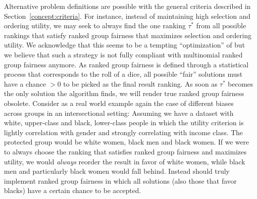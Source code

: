 \label{concept:related-problems}
%
Alternative problem definitions are possible with the general criteria described in Section~\ref{concept:criteria}.
%
For instance, instead of maintaining high selection and ordering utility, we may seek to always find the one ranking $\tau^*$ from all possible rankings that satisfy ranked group fairness that maximizes selection and ordering utility. 
%
We acknowledge that this seems to be a tempting ``optimization'' of \algoFAIR but we believe that such a strategy is not fully compliant with multinomial ranked group fairness anymore. 
%
As ranked group fairness is defined through a statistical process that corresponds to the roll of a dice, all possible ``fair'' solutions must have a chance $>0$ to be picked as the final result ranking.
%
As soon as $\tau^*$ becomes the only solution the algorithm finds, we will render true ranked group fairness obsolete. 
%
Consider as a real world example again the case of different biases across groups in an intersectional setting:
%
Assuming we have a dataset with white, upper-class and black, lower-class people in which the utility criterion is lightly correlation with gender and strongly correlating with income class.
%
The protected group would be white women, black men and black women.
%
If we were to always choose the ranking that satisfies ranked group fairness and maximizes utility, we would \emph{always} reorder the result in favor of white women, while black men and particularly black women would fall behind.
%
Instead \algoFAIR should truly implement ranked group fairness in which all solutions (also those that favor blacks) have a certain chance to be accepted.
